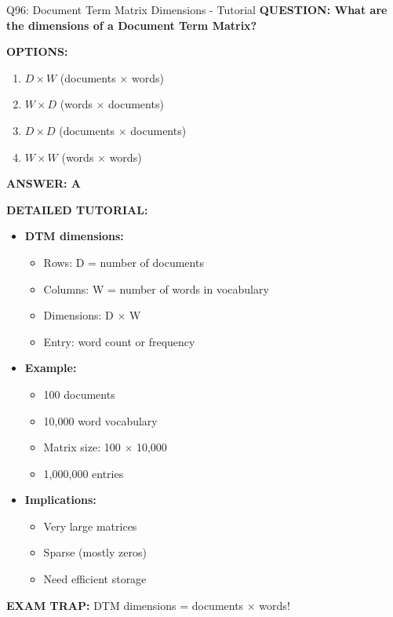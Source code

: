 \documentclass[8pt]{beamer}
\begin{document}
	\begin{frame}{Q96: Document Term Matrix Dimensions - Tutorial}
		\fontsize{6.5}{7.5}\selectfont
		\textbf{QUESTION: What are the dimensions of a Document Term Matrix?}
		
		\vspace{0.1cm}
		\textbf{OPTIONS:}
		\begin{enumerate}
			\item $D \times W$ (documents $\times$ words)
			\item $W \times D$ (words $\times$ documents)
			\item $D \times D$ (documents $\times$ documents)
			\item $W \times W$ (words $\times$ words)
		\end{enumerate}
		
		\vspace{0.1cm}
		\textcolor{myblue}{\textbf{ANSWER: A}}
		
		\vspace{0.1cm}
		\textbf{DETAILED TUTORIAL:}
		\begin{itemize}
			\item \textbf{DTM dimensions:}
			\begin{itemize}
				\item Rows: D = number of documents
				\item Columns: W = number of words in vocabulary
				\item Dimensions: D $\times$ W
				\item Entry: word count or frequency
			\end{itemize}
			\item \textbf{Example:}
			\begin{itemize}
				\item 100 documents
				\item 10,000 word vocabulary
				\item Matrix size: 100 $\times$ 10,000
				\item 1,000,000 entries
			\end{itemize}
			\item \textbf{Implications:}
			\begin{itemize}
				\item Very large matrices
				\item Sparse (mostly zeros)
				\item Need efficient storage
			\end{itemize}
		\end{itemize}
		
		\textcolor{myred}{\textbf{EXAM TRAP:}} DTM dimensions = \textcolor{myblue}{documents $\times$ words}!
	\end{frame}
	
\end{document}
